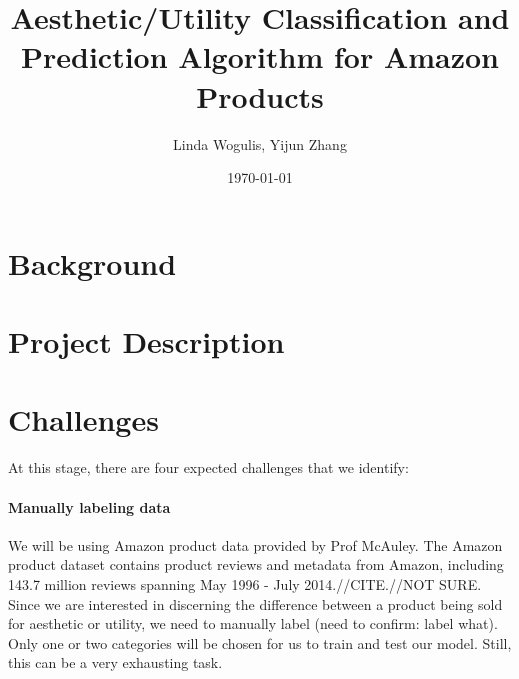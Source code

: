 \documentclass[dvips,12pt]{article}
\begin{document}

\title{\textbf{Aesthetic/Utility Classification and Prediction Algorithm for Amazon Products}}
\author{Linda Wogulis, Yijun Zhang}
\date{\today}



\maketitle


\section{Background}



\section{Project Description}



\section{Challenges}

At this stage, there are four expected challenges that we identify:

\paragraph{Manually labeling data}
We will be using Amazon product data provided by Prof McAuley. The Amazon product dataset contains product reviews and metadata from Amazon, including 143.7 million reviews spanning May 1996 - July 2014.//CITE.//NOT SURE. Since we are interested in discerning the difference between a product being sold for aesthetic or utility, we need to manually label (need to confirm: label what). Only one or two categories will be chosen for us to train and test our model. Still, this can be a very exhausting task. 
\end{document}
